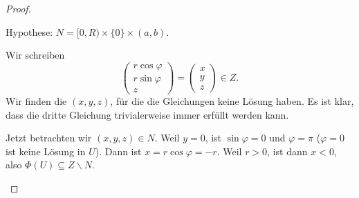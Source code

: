 \begin{proof}
	\begin{parts}
	\item Hypothese: $N=[0,R)\times \{0\} \times (a,b)$.

		Wir schreiben
		\[
		\begin{pmatrix} r\cos\varphi \\r\sin\varphi \\ z \end{pmatrix} =\begin{pmatrix} x \\ y \\ z \end{pmatrix}\in Z 
		.\] 
		Wir finden die $(x,y,z)$, f\"{u}r die die Gleichungen keine Lösung haben. Es ist klar, dass die dritte Gleichung trivialerweise immer erfüllt werden kann. 

		Jetzt betrachten wir $(x,y,z)\in N$. Weil $y=0$, ist $\sin\varphi=0$ und $\varphi=\pi$ ($\varphi=0$ ist keine Lösung in $U$). Dann ist $x=r\cos\varphi=-r$. Weil $r>0$, ist dann $x<0$, also $\Phi(U)\subseteq Z\backslash N$.


\end{parts}
\end{proof}
